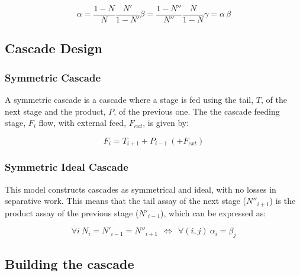 \begin{subequations}
    \label{eq_alphabeta}
    \begin{equation} \label{eq_alpha_def}
        \alpha = \frac{1-N}{N}\frac{N'}{1-N'}
    \end{equation}
    \begin{equation}\label{eq_beta-def}
        \beta = \frac{1-N''}{N''}\frac{N}{1-N}
    \end{equation}
    \begin{equation}\label{eq_gamma-def}
        \gamma = \alpha \, \beta
    \end{equation}
\end{subequations}


\subsection{Cascade Design}
\subsubsection{Symmetric Cascade}

A symmetric cascade is a cascade where a stage is fed using the tail, $T$, of the next stage and the product, $P$, of the previous one. The the cascade feeding stage, $F_{i}$ flow, with external feed, $F_{ext}$, is given by:

\begin{equation}
    F_{i} = T_{i+1} + P_{i-1} ~(+ F_{ext})
\end{equation}

\subsubsection{Symmetric Ideal Cascade}
This model constructs cascades as symmetrical and ideal, with no losses in
separative work. This means that the tail assay of the next stage ($N''_{i+1}$)
is the product assay of the previous stage ($N'_{i-1}$), which can be
expressed as:

\begin{equation}
    \forall i~ N_{i} = N'_{i-1} = N''_{i+1}~ ~\Leftrightarrow~ ~\forall (i,j)~
    \alpha_{i} = \beta_{j}
\end{equation}



\subsection{Building the cascade}


